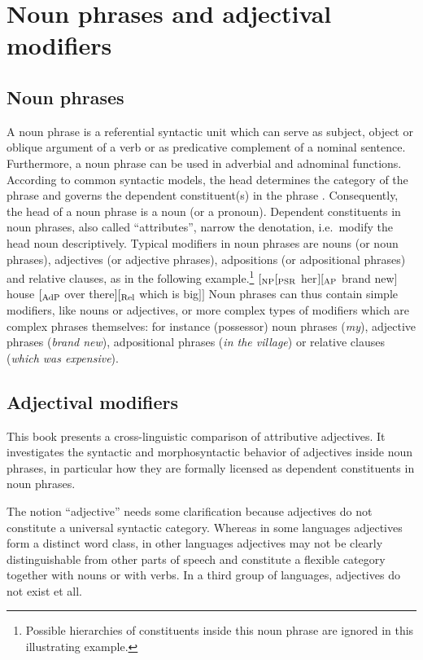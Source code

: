 
\chapter{Noun phrases and adjectival modifiers}

\section{Noun phrases}
A noun phrase is a referential syntactic unit which can serve as subject, object or oblique argument of a verb or as predicative complement of a nominal sentence. Furthermore, a noun phrase can be used in adverbial and adnominal functions. According to common syntactic models, the head determines the category of the phrase and governs the dependent constituent(s) in the phrase \parencite[cf.][57]{nichols1986}. Consequently, the head of a noun phrase is a noun (or a pronoun). Dependent constituents in noun phrases, also called “attributes”, narrow the denotation, i.e.~modify the head noun descriptively. Typical modifiers in noun phrases are nouns (or noun phrases), adjectives (or adjective phrases), adpositions (or adpositional phrases) and relative clauses, as in the following example.\footnote{Possible hierarchies of constituents inside this noun phrase are ignored in this illustrating example.}
\ea 
$[_{\rm NP} [_{\rm PSR}$ her$] [_{\rm AP}$ brand new$]$ house $[_{\rm AdP}$ over there$] [_{\rm Rel}$ which is big$] ]$
\z
Noun phrases can thus contain simple modifiers, like nouns or adjectives, or more complex types of modifiers which are complex phrases themselves: for instance (possessor) noun phrases (\textit{my}), adjective phrases (\textit{brand new}), adpositional phrases (\textit{in the village}) or relative clauses (\textit{which was expensive}).

\section{Adjectival modifiers}
This book presents a cross-linguistic comparison of attributive adjectives. It investigates the syntactic and morphosyntactic behavior of adjectives inside noun phrases, in particular how they are formally licensed as dependent constituents in noun phrases.

The notion “adjective” needs some clarification because adjectives do not constitute a universal syntactic category. Whereas in some languages adjectives form a distinct word class, in other languages adjectives may not be clearly distinguishable from other parts of speech and constitute a flexible category together with nouns or with verbs. In a third group of languages, adjectives do not exist et all.


